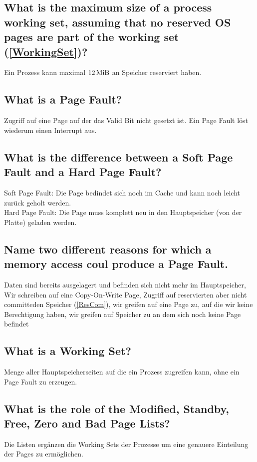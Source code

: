 \subsection{What is the maximum size of a process working set, assuming that no reserved OS pages are part of the working set (\ref{WorkingSet})?}
Ein Prozess kann maximal $12 \operatorname{MiB}$ an Speicher reserviert haben.

\subsection{\important What is a Page Fault?}
Zugriff auf eine Page auf der das Valid Bit nicht gesetzt ist. Ein Page Fault löst wiederum einen Interrupt aus.

\subsection{What is the difference between a Soft Page Fault and a Hard Page Fault?}
Soft Page Fault: Die Page bedindet sich noch im Cache und kann noch leicht zurück geholt werden.\\
Hard Page Fault: Die Page muss komplett neu in den Hauptspeicher (von der Platte) geladen werden.

\subsection{Name two different reasons for which a memory access coul produce a Page Fault.}
Daten sind bereits ausgelagert und befinden sich nicht mehr im Hauptspeicher, Wir schreiben auf eine Copy-On-Write Page, Zugriff auf reservierten aber nicht committeden Speicher (\ref{ResCom}), wir greifen auf eine Page zu, auf die wir keine Berechtigung haben, wir greifen auf Speicher zu an dem sich noch keine Page befindet

\subsection{\important What is a Working Set?\label{WorkingSet}}
Menge aller Hauptspeicherseiten auf die ein Prozess zugreifen kann, ohne ein Page Fault zu erzeugen.

\subsection{What is the role of the Modified, Standby, Free, Zero and Bad Page Lists?}
Die Listen ergänzen die Working Sets der Prozesse um eine genauere Einteilung der Pages zu ermöglichen.

